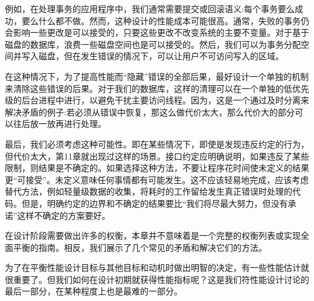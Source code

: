 例如，在处理事务的应用程序中，我们通常需要提交或回滚语义:每个事务要么成功，要么什么都不做。然而，这种设计的性能成本可能很高。通常，失败的事务仍会影响一些更改是可以接受的，只要这些更改不改变系统的主要不变量。对于基于磁盘的数据库，浪费一些磁盘空间也是可以接受的。然后，我们可以为事务分配空间并写入磁盘，但在发生错误的情况下，可以让用户不可访问写入的区域。

在这种情况下，为了提高性能而“隐藏”错误的全部后果，最好设计一个单独的机制来清除这些错误的后果。对于我们的数据库，这样的清理可以在一个单独的低优先级的后台进程中进行，以避免干扰主要访问线程。因为，这是一个通过及时分离来解决矛盾的例子:若必须从错误中恢复，那这么做代价太大，那么代价大的部分可以往后放一放再进行处理。

最后，我们必须考虑这种可能性。即在某些情况下，即使是发现违反约定的行为，但代价太大，第11章就出现过这样的场景。接口约定应明确说明，如果违反了某些限制，则结果是不确定的。如果选择这种方法，不要让程序花时间使未定义的结果更“可接受”。未定义意味任何事情都有可能发生。这不应该轻易地完成，应该考虑替代方法，例如轻量级数据的收集，将耗时的工作留给发生真正错误时处理的代码。但是，明确约定的边界和不确定的结果要比“我们将尽最大努力，但没有承诺”这样不确定的方案要好。 

在设计阶段需要做出许多的权衡，本章并不意味着是一个完整的权衡列表或实现全面平衡的指南。相反，我们展示了几个常见的矛盾和解决它们的方法。 

为了在平衡性能设计目标与其他目标和动机时做出明智的决定，有一些性能估计就很重要了。但我们如何在设计初期就获得性能指标呢？这是我们符性能设计讨论的最后一部分，在某种程度上也是最难的一部分。














